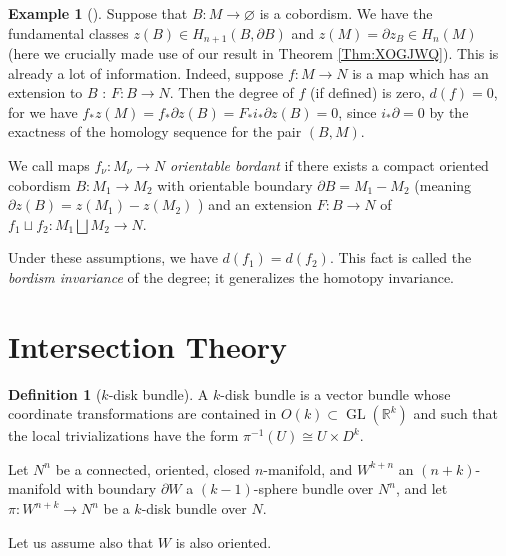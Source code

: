\documentclass[reqno]{amsart}
\theoremstyle{definition}
\newtheorem{definition}[theorem]{Definition}
\newtheorem{example}[theorem]{Example}
\theoremstyle{remark}
\DeclareMathOperator{\GL}{GL}
\begin{document}
\begin{example}[]
    Suppose that
    $B \colon M \to \varnothing$ is a cobordism.
    We have the fundamental classes
    $z(B) \in H_{n+1}(B, \partial B)$ and
    $z(M) = \partial z_{B} \in 
    H_n (M)$ (here we crucially made use of our result
    in Theorem \ref{Thm:XOGJWQ}). This is already a lot of
    information. Indeed, suppose $f \colon M \to N$ is a 
    map which has an extension to $B$ : $F\colon B \to N$.
    Then the degree of $f$ (if defined) is zero,
    $d(f) = 0$, for we have
    $f_* z(M) = f_* \partial z(B) = 
    F_* i_* \partial z(B) = 0$, since
    $i_* \partial = 0$ by the exactness of the
    homology sequence for the pair
    $\left( B, M \right) $.

    We call maps $f_{\nu} \colon M_{\nu} \to N$ 
    \textit{orientable bordant} if there exists
    a compact oriented cobordism 
    $B \colon M_1 \to M_2$ with orientable
    boundary $\partial B = M_1 - M_2$ (meaning
    $\partial z(B) = z(M_1) - z(M_2)$ ) and an extension
    $F \colon B \to N$ of 
    $f_1 \sqcup  f_2 \colon M_1 \bigsqcup M_2 \to N$.

    Under these assumptions, we have
    $d(f_1) = d(f_2)$. This fact
    is called the \textit{bordism invariance} of the
    degree; it generalizes the homotopy invariance.
\end{example}








\section{Intersection Theory}



\begin{definition}[$k$-disk bundle]
    A $k$-disk bundle is a vector bundle whose
    coordinate transformations are contained in
    $O(k) \subset \GL (\mathbb{R}^{k})$ and such that
    the local trivializations have the form
    $\pi^{-1}(U) \cong U \times D^{k}$.
\end{definition}

Let $N^{n}$ be a connected, oriented, closed $n$-manifold, and
$W^{k+n}$ an $(n+k)$-manifold with boundary
$\partial W$ a $(k-1)$-sphere bundle over $N^{n}$, and let
$\pi \colon W^{n+k} \to N^{n}$ be a $k$-disk bundle over $N$.

Let us assume also that $W$ is also oriented.
\end{document}
